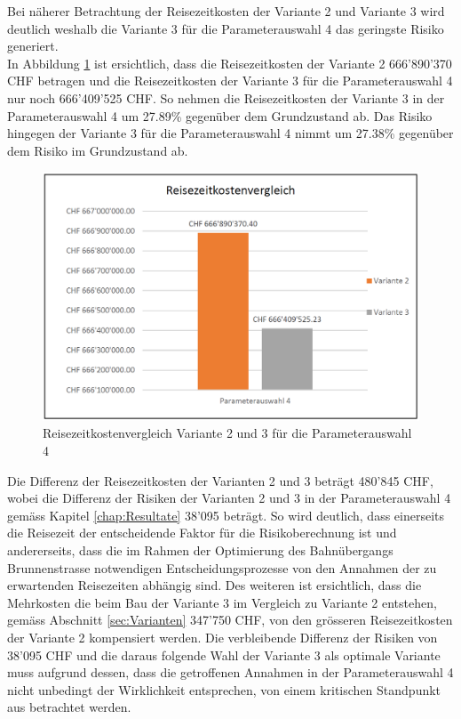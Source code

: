 Bei näherer Betrachtung der Reisezeitkosten der Variante 2 und Variante 3 wird deutlich weshalb die Variante 3 für die Parameterauswahl 4 das geringste Risiko generiert. \\
In Abbildung \ref{img:ReisezeitkostenV2-V3-Z4} ist ersichtlich, dass die Reisezeitkosten der Variante 2 666'890'370 CHF betragen und die Reisezeitkosten der Variante 3 für die Parameterauswahl 4 nur noch 666'409'525 CHF. So nehmen die Reisezeitkosten der Variante 3 in der Parameterauswahl 4 um 27.89\% gegenüber dem Grundzustand ab. Das Risiko hingegen der Variante 3 für die Parameterauswahl 4 nimmt um 27.38\% gegenüber dem Risiko im Grundzustand ab.

\begin{figure}[h!]
	\centering
	\includegraphics[width=.45\textwidth]{figures/f-06-07-ReisezeitVergleichV2_V3-Z0}
	\caption[Reisezeitkostenvergleich Variante 2 und 3 Parameterauswahl 4]{Reisezeitkostenvergleich Variante 2 und 3 für die Parameterauswahl 4}
	\label{img:ReisezeitkostenV2-V3-Z4}
\end{figure} 

Die Differenz der Reisezeitkosten der Varianten 2 und 3 beträgt 480'845 CHF, wobei die Differenz der Risiken der Varianten 2 und 3 in der Parameterauswahl 4 gemäss Kapitel \ref{chap:Resultate} 38'095 beträgt. So wird deutlich, dass einerseits die Reisezeit der entscheidende Faktor für die Risikoberechnung ist und andererseits, dass die im Rahmen der Optimierung des Bahnübergangs Brunnenstrasse notwendigen Entscheidungsprozesse von den Annahmen der zu erwartenden Reisezeiten abhängig sind.
Des weiteren ist ersichtlich, dass die Mehrkosten die beim Bau der Variante 3 im Vergleich zu Variante 2 entstehen, gemäss Abschnitt \ref{sec:Varianten} 347'750 CHF, von den grösseren Reisezeitkosten der Variante 2 kompensiert werden. Die verbleibende Differenz der Risiken von 38'095 CHF und die daraus folgende Wahl der Variante 3 als optimale Variante muss aufgrund dessen, dass die getroffenen Annahmen in der Parameterauswahl 4 nicht unbedingt der Wirklichkeit entsprechen, von einem kritischen Standpunkt aus betrachtet werden.


